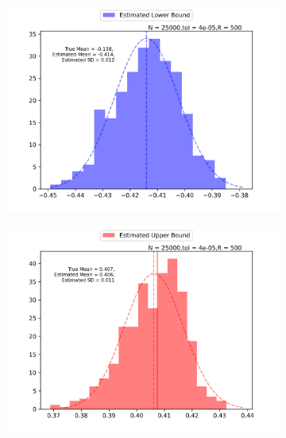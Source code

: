 \documentclass{article}
\begin{document}
\begin{figure}[h!]
     \begin{subfigure}[b]{0.49\textwidth}
         \centering
         \includegraphics[width=\textwidth]{graph/histo_beta_lo25000_500_4e-05.png}
     \end{subfigure}
    \hfill
     \begin{subfigure}[b]{0.49\textwidth}
         \centering
         \includegraphics[width=\textwidth]{graph/histo_beta_hi25000_500_4e-05.png}
     \end{subfigure}     


\end{figure}
\end{document}

